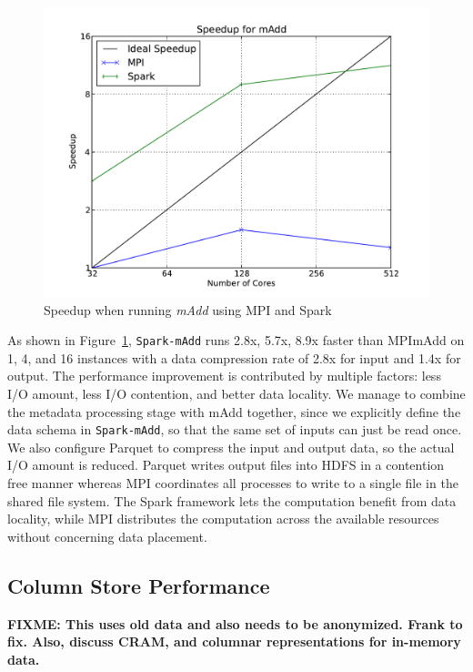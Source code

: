 \documentclass{acm_proc_article-sp}
\begin{document}
\begin{figure}[h]
\begin{center}
\includegraphics[width=0.99\linewidth]{graphs/speedup_madd.pdf}
\end{center}
\caption{Speedup when running \textit{mAdd} using MPI and Spark}
\label{fig:madd-speedup}
\end{figure}

As shown in Figure~\ref{fig:madd-speedup}, \texttt{Spark-mAdd} runs 2.8x, 5.7x, 8.9x faster than
MPImAdd on 1, 4, and 16 instances with a data compression rate of 2.8x for input and 1.4x for output.
The performance improvement is contributed by multiple factors: less I/O amount, less I/O contention,
and better data locality. We manage to combine the metadata processing stage with mAdd together,
since we explicitly define the data schema in \texttt{Spark-mAdd}, so that the same set of inputs can just
be read once. We also configure Parquet to compress the input and output data, so the actual I/O
amount is reduced. Parquet writes output files into HDFS in a contention free manner whereas MPI
coordinates all processes to write to a single file in the shared file system. The Spark framework lets the
computation benefit from data locality, while MPI distributes the computation across the available
resources without concerning data placement.

\subsection{Column Store Performance}
\label{sec:column-store-perf}

\textbf{FIXME: This uses old data and also needs to be anonymized. Frank to fix. Also, discuss CRAM, and columnar representations for in-memory data.}
\end{document}
